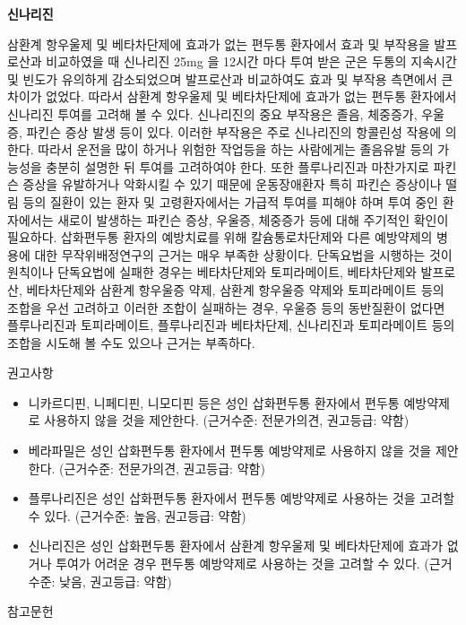 \documentclass[]{book}
\begin{document}
\textbf{신나리진}

삼환계 항우울제 및 베타차단제에 효과가 없는 편두통 환자에서 효과 및 부작용을 발프로산과 비교하였을 때 신나리진 25mg 을 12시간 마다 투여 받은 군은 두통의 지속시간 및 빈도가 유의하게 감소되었으며 발프로산과 비교하여도 효과 및 부작용 측면에서 큰 차이가 없었다. 따라서 삼환계 항우울제 및 베타차단제에 효과가 없는 편두통 환자에서 신나리진 투여를 고려해 볼 수 있다. 신나리진의 중요 부작용은 졸음, 체중증가, 우울증, 파킨슨 증상 발생 등이 있다. 이러한 부작용은 주로 신나리진의 항콜린성 작용에 의한다. 따라서 운전을 많이 하거나 위험한 작업등을 하는 사람에게는 졸음유발 등의 가능성을 충분히 설명한 뒤 투여를 고려하여야 한다. 또한 플루나리진과 마찬가지로 파킨슨 증상을 유발하거나 악화시킬 수 있기 때문에 운동장애환자 특히 파킨슨 증상이나 떨림 등의 질환이 있는 환자 및 고령환자에서는 가급적 투여를 피해야 하며 투여 중인 환자에서는 새로이 발생하는 파킨슨 증상, 우울증, 체중증가 등에 대해 주기적인 확인이 필요하다.
삽화편두통 환자의 예방치료를 위해 칼슘통로차단제와 다른 예방약제의 병용에 대한 무작위배정연구의 근거는 매우 부족한 상황이다. 단독요법을 시행하는 것이 원칙이나 단독요법에 실패한 경우는 베타차단제와 토피라메이트, 베타차단제와 발프로산, 베타차단제와 삼환계 항우울증 약제, 삼환계 항우울증 약제와 토피라메이트 등의 조합을 우선 고려하고 이러한 조합이 실패하는 경우, 우울증 등의 동반질환이 없다면 플루나리진과 토피라메이트, 플루나리진과 베타차단제, 신나리진과 토피라메이트 등의 조합을 시도해 볼 수도 있으나 근거는 부족하다.

권고사항

\begin{itemize}
\item
  니카르디핀, 니페디핀, 니모디핀 등은 성인 삽화편두통 환자에서 편두통 예방약제로 사용하지 않을 것을 제안한다. (근거수준: 전문가의견, 권고등급: 약함)
\item
  베라파밀은 성인 삽화편두통 환자에서 편두통 예방약제로 사용하지 않을 것을 제안한다. (근거수준: 전문가의견, 권고등급: 약함)
\item
  플루나리진은 성인 삽화편두통 환자에서 편두통 예방약제로 사용하는 것을 고려할 수 있다. (근거수준: 높음, 권고등급: 약함)
\item
  신나리진은 성인 삽화편두통 환자에서 삼환계 항우울제 및 베타차단제에 효과가 없거나 투여가 어려운 경우 편두통 예방약제로 사용하는 것을 고려할 수 있다. (근거수준: 낮음, 권고등급: 약함)
\end{itemize}

참고문헌
\end{document}
